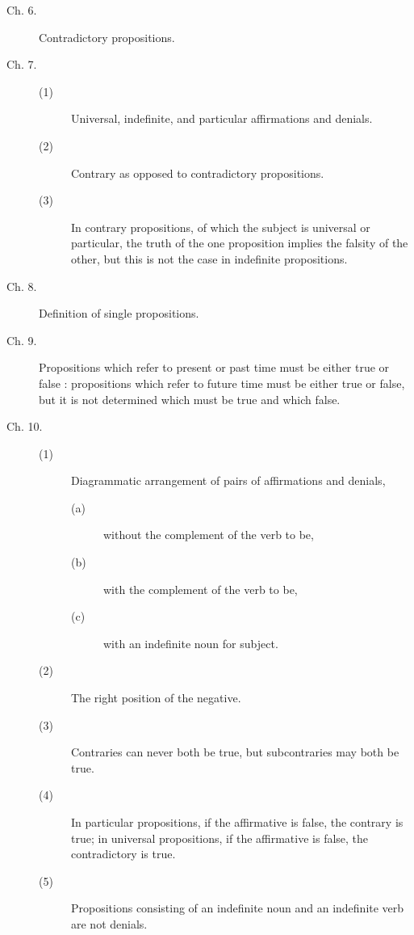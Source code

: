 \begin{description}
\item[Ch. 6.]
Contradictory propositions. 

\item[Ch. 7.]
\begin{description}
\item[(1)] Universal, indefinite, and particular affirmations and denials. 

\item[(2)] Contrary as opposed to contradictory propositions. 

\item[(3)] In contrary propositions, of which the subject is universal or particular,
  the truth of the one proposition implies the falsity of the other,
  but this is not the case in indefinite propositions. 
\end{description}

\item[Ch. 8.]
Definition of single propositions. 

\item[Ch. 9.] Propositions which refer to present or past time must be either true or false :
  propositions which refer to future time must be either true or false,
  but it is not determined which must be true and which false. 

\item[Ch. 10.]
\begin{description}
 \item[(1)] Diagrammatic arrangement of pairs of affirmations and denials,
\begin{description}
\item[(a)] without the complement of the verb to be,
\item[(b)] with the complement of the verb to be,
\item[(c)] with an indefinite noun for subject. 
\end{description}

\item[(2)] The right position of the negative. 

\item[(3)] Contraries can never both be true, but subcontraries may both be true. 

\item[(4)] In particular propositions, if the affirmative is false, the contrary is true;
  in universal propositions, if the affirmative is false, the contradictory is true. 

\item[(5)] Propositions consisting of an indefinite noun and an indefinite verb are not denials. 


\end{description}
\end{description}
